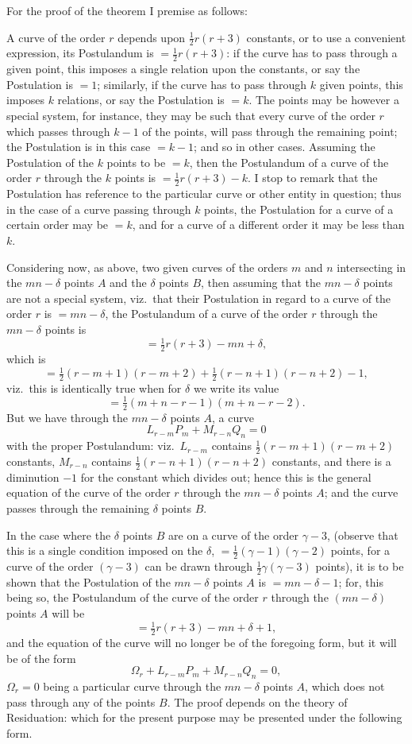 \documentclass[12pt,a4paper]{article}
\theoremstyle{definition}
\begin{document}
For the proof of the theorem I premise as follows:

A curve of the order $r$ depends upon $\tfrac12 r(r+3)$ constants, or to use a convenient
expression, its Postulandum is $= \tfrac12 r(r+3)$: if the curve has to pass through a given
point, this imposes a single relation upon the constants, or say the Postulation is $= 1$;
similarly, if the curve has to pass through $k$ given points, this imposes $k$ relations,
or say the Postulation is $= k$. The points may be however a special system, for
instance, they may be such that every curve of the order $r$ which passes through
$k-1$ of the points, will pass through the remaining point; the Postulation is in this
case $= k-1$; and so in other cases. Assuming the Postulation of the $k$ points to
be $= k$, then the Postulandum of a curve of the order $r$ through the $k$ points is
$= \tfrac12 r(r+3) - k$. I stop to remark that the Postulation has reference to the particular
curve or other entity in question; thus in the case of a curve passing through
$k$ points, the Postulation for a curve of a certain order may be $= k$, and for a
curve of a different order it may be less than $k$.

Considering now, as above, two given curves of the orders $m$ and $n$ intersecting
in the $mn - \delta$ points $A$ and the $\delta$ points $B$, then assuming that the $mn - \delta$ points
are not a special system, viz.\ that their Postulation in regard to a curve of the
order $r$ is $= mn - \delta$, the Postulandum of a curve of the order $r$ through the $mn - \delta$
points is
\[
= \tfrac12 r(r+3) - mn + \delta,
\]
which is
\[
= \tfrac12(r-m+1)(r-m+2) + \tfrac12(r-n+1)(r-n+2) - 1,
\]
viz.\ this is identically true when for $\delta$ we write its value
\[
= \tfrac12(m+n-r-1)(m+n-r-2).
\]
But we have through the $mn - \delta$ points $A$, a curve
\[
L_{r-m} P_m + M_{r-n} Q_n = 0
\]
with the proper Postulandum: viz.\ $L_{r-m}$ contains $\tfrac12(r-m+1)(r-m+2)$ constants,
$M_{r-n}$ contains $\tfrac12(r-n+1)(r-n+2)$ constants, and there is a diminution $-1$ for the
constant which divides out; hence this is the general equation of the curve of the
order $r$ through the $mn - \delta$ points $A$; and the curve passes through the remaining
$\delta$ points $B$.

In the case where the $\delta$ points $B$ are on a curve of the order $\gamma-3$, (observe
that this is a single condition imposed on the $\delta$, $= \tfrac12(\gamma-1)(\gamma-2)$ points, for a curve
of the order $(\gamma-3)$ can be drawn through $\tfrac12\gamma(\gamma-3)$ points), it is to be shown that
the Postulation of the $mn - \delta$ points $A$ is $= mn - \delta - 1$; for, this being so, the
Postulandum of the curve of the order $r$ through the $(mn - \delta)$ points $A$ will be
\[
= \tfrac12 r(r+3) - mn + \delta + 1,
\]
and the equation of the curve will no longer be of the foregoing form, but it will
be of the form
\[
\Omega_r + L_{r-m} P_m + M_{r-n} Q_n = 0,
\]
$\Omega_r = 0$ being a particular curve through the $mn - \delta$ points $A$, which does not pass
through any of the points $B$. The proof depends on the theory of Residuation: which
for the present purpose may be presented under the following form.
\end{document}
